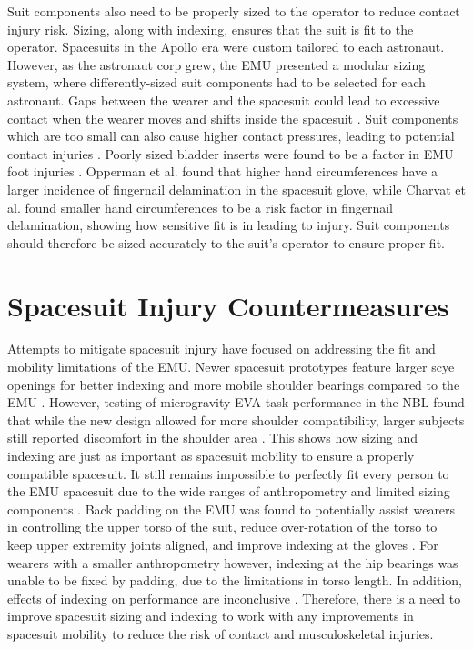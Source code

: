 \documentclass[defaultstyle,11pt]{thesis}
\begin{document}
Suit components also need to be properly sized to the operator to reduce contact injury risk.
Sizing, along with indexing, ensures that the suit is fit to the operator.
Spacesuits in the Apollo era were custom tailored to each astronaut.
However, as the astronaut corp grew, the EMU presented a modular sizing system, where differently-sized suit components had to be selected for each astronaut.
Gaps between the wearer and the spacesuit could lead to excessive contact when the wearer moves and shifts inside the spacesuit \citep{Benson2009}.
Suit components which are too small can also cause higher contact pressures, leading to potential contact injuries \citep{Anderson2015b}.
Poorly sized bladder inserts were found to be a factor in EMU foot injuries \citep{Strauss2004}. Opperman et al. \citep{Opperman2010} found that higher hand circumferences have a larger incidence of fingernail delamination in the spacesuit glove, while Charvat et al. \citep{Charvat2015} found smaller hand circumferences to be a risk factor in fingernail delamination, showing how sensitive fit is in leading to injury.
Suit components should therefore be sized accurately to the suit's operator to ensure proper fit.

\hypertarget{spacesuit-injury-countermeasures}{%
\section{Spacesuit Injury Countermeasures}\label{spacesuit-injury-countermeasures}}

Attempts to mitigate spacesuit injury have focused on addressing the fit and mobility limitations of the EMU.
Newer spacesuit prototypes feature larger scye openings for better indexing and more mobile shoulder bearings compared to the EMU \citep{Graziosi2016}.
However, testing of microgravity EVA task performance in the NBL found that while the new design allowed for more shoulder compatibility, larger subjects still reported discomfort in the shoulder area \citep{Meginnis2018}.
This shows how sizing and indexing are just as important as spacesuit mobility to ensure a properly compatible spacesuit.
It still remains impossible to perfectly fit every person to the EMU spacesuit due to the wide ranges of anthropometry and limited sizing components \citep{Benson2009}.
Back padding on the EMU was found to potentially assist wearers in controlling the upper torso of the suit, reduce over-rotation of the torso to keep upper extremity joints aligned, and improve indexing at the gloves \citep{Chappell2017}.
For wearers with a smaller anthropometry however, indexing at the hip bearings was unable to be fixed by padding, due to the limitations in torso length.
In addition, effects of indexing on performance are inconclusive \citep{Fineman2018}.
Therefore, there is a need to improve spacesuit sizing and indexing to work with any improvements in spacesuit mobility to reduce the risk of contact and musculoskeletal injuries.
\end{document}
